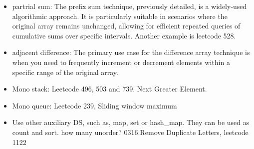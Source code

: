 \documentclass[a4paper,11pt,twoside]{book}
\begin{document}
\begin{itemize}
	\item partrial sum: The prefix sum technique, previously detailed, is a widely-used algorithmic approach. It is particularly suitable in scenarios where the original array remains unchanged, allowing for efficient repeated queries of cumulative sums over specific intervals. Another example is leetcode 528. 
	
	\item adjacent difference: The primary use case for the difference array technique is when you need to frequently increment or decrement elements within a specific range of the original array.
	
	\item Mono stack: Leetcode 496, 503 and 739. Next Greater Element.
	
	\item Mono queue: Leetcode 239, Sliding window maximum
	
	\item Use other auxiliary DS, such as, map, set or hash\_map.  They can be used as count and sort.  how many unorder?  0316.Remove Duplicate Letters, leetcode 1122
		
\end{itemize}
\end{document}
